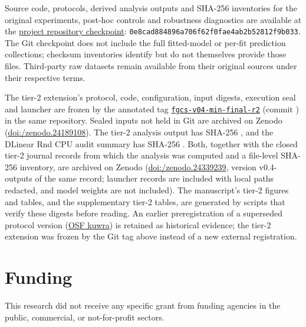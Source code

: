 \documentclass[a4paper,fleqn]{cas-dc}
\begin{document}
Source code, protocols, derived analysis outputs and SHA-256 inventories for
the original experiments, post-hoc controls and robustness diagnostics are
available at the
\href{https://github.com/KADOUMAAbdelhak/TimeTrack-Forecasting-Framework/tree/0e8cad884896a706f62f0fae4ab2b52812f9b033}{project repository checkpoint}:\newline
\texttt{0e8cad884896a706f62f0fae4ab2b52812f9b033}.
The Git checkpoint does not include the full fitted-model or per-fit prediction
collections; checksum inventories identify but do not themselves provide those
files. Third-party raw datasets remain available from their original sources
under their respective terms.

The tier-2 extension's protocol, code, configuration, input digests,
execution seal and launcher are frozen by the annotated tag
\href{https://github.com/KADOUMAAbdelhak/TimeTrack-Forecasting-Framework/tree/fgcs-v04-min-final-r2}{\texttt{fgcs-v04-min-final-r2}}
(commit \texttt{}) in the same
repository. Sealed inputs not held in Git are archived on Zenodo
(\href{https://doi.org/10.5281/zenodo.24189108}{doi:/\allowbreak zenodo.24189108}).
The tier-2 analysis output has SHA-256
\texttt{},
and the DLinear Rnd CPU audit summary has SHA-256
\texttt{}.
Both, together with the closed tier-2 journal records from which the analysis
was computed and a file-level SHA-256 inventory, are archived on Zenodo
(\href{https://doi.org/10.5281/zenodo.24339239}{doi:/\allowbreak zenodo.24339239},
version v0.4-outputs of the same record; launcher records are included with
local paths redacted, and model weights are not included). The manuscript's
tier-2 figures and tables, and the supplementary tier-2 tables, are
generated by scripts that verify these digests before reading.
An earlier preregistration of a superseded protocol version
(\href{https://osf.io/kuwra}{OSF kuwra}) is retained as historical evidence;
the tier-2 extension was frozen by the Git tag above instead of a new
external registration.

\printcredits

\section*{Funding}

This research did not receive any specific grant from funding agencies in
the public, commercial, or not-for-profit sectors.
\end{document}
